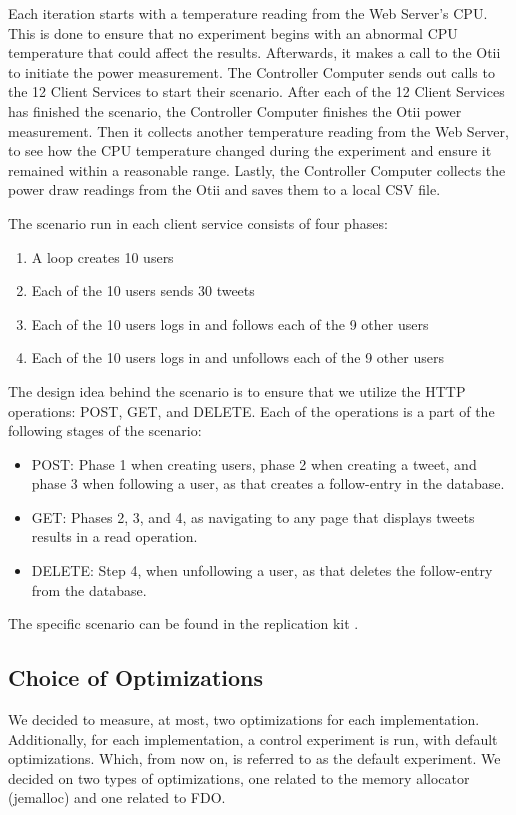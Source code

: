 \documentclass[main.tex]{subfiles}
\begin{document}
Each iteration starts with a temperature reading from the Web Server's CPU. This is done to ensure that no experiment begins with an abnormal CPU temperature that could affect the results. Afterwards, it makes a call to the Otii to initiate the power measurement. The Controller Computer sends out calls to the 12 Client Services to start their scenario. After each of the 12 Client Services has finished the scenario, the Controller Computer finishes the Otii power measurement. Then it collects another temperature reading from the Web Server, to see how the CPU temperature changed during the experiment and ensure it remained within a reasonable range. Lastly, the Controller Computer collects the power draw readings from the Otii and saves them to a local CSV file.

The scenario run in each client service consists of four phases:

\begin{enumerate}
    \item A loop creates 10 users
    \item Each of the 10 users sends 30 tweets
    \item Each of the 10 users logs in and follows each of the 9 other users
    \item Each of the 10 users logs in and unfollows each of the 9 other users
\end{enumerate}

The design idea behind the scenario is to ensure that we utilize the HTTP operations: POST, GET, and DELETE. Each of the operations is a part of the following stages of the scenario:

\begin{itemize}
    \item POST: Phase 1 when creating users, phase 2 when creating a tweet, and phase 3 when following a user, as that creates a follow-entry in the database. 
    \item GET: Phases 2, 3, and 4, as navigating to any page that displays tweets results in a read operation.
    \item DELETE: Step 4, when unfollowing a user, as that deletes the follow-entry from the database.
\end{itemize}

The specific scenario can be found in the replication kit \cite{replication-kit-Karlsen_Landsgaard_Offenberg_Pedersen_2025}.

\subsection{Choice of Optimizations}
We decided to measure, at most, two optimizations for each implementation. Additionally, for each implementation, a control experiment is run, with default optimizations. Which, from now on, is referred to as the default experiment. We decided on two types of optimizations, one related to the memory allocator (jemalloc) and one related to FDO.
\end{document}
